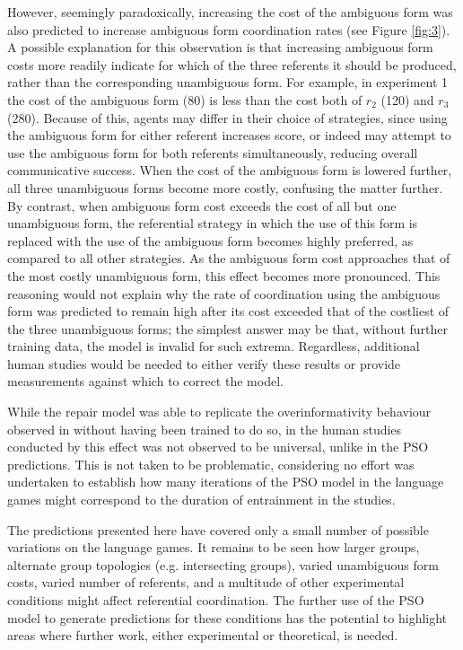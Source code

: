 \documentclass[12pt,a4paper]{article}
\begin{document}
However, seemingly paradoxically, increasing the cost of the ambiguous form was also predicted to increase ambiguous form coordination rates (see Figure \ref{fig:3}). A possible explanation for this observation is that increasing ambiguous form costs more readily indicate for which of the three referents it should be produced, rather than the corresponding unambiguous form. For example, in experiment 1 the cost of the ambiguous form (80) is less than the cost both of $r_2$ (120) and $r_3$ (280). Because of this, agents may differ in their choice of strategies, since using the ambiguous form for either referent increases score, or indeed may attempt to use the ambiguous form for both referents simultaneously, reducing overall communicative success. When the cost of the ambiguous form is lowered further, all three unambiguous forms become more costly, confusing the matter further. By contrast, when ambiguous form cost exceeds the cost of all but one unambiguous form, the referential strategy in which the use of this form is replaced with the use of the ambiguous form becomes highly preferred, as compared to all other strategies. As the ambiguous form cost approaches that of the most costly unambiguous form, this effect becomes more pronounced. This reasoning would not explain why the rate of coordination using the ambiguous form was predicted to remain high after its cost exceeded that of the costliest of the three unambiguous forms; the simplest answer may be that, without further training data, the model is invalid for such extrema. Regardless, additional human studies would be needed to either verify these results or provide measurements against which to correct the model.

While the repair model was able to replicate the overinformativity behaviour observed in \citeauthor{brennan1996} without having been trained to do so, in the human studies conducted by \citeauthor{brennan1996} this effect was not observed to be universal, unlike in the PSO predictions. This is not taken to be problematic, considering no effort was undertaken to establish how many iterations of the PSO model in the \citeauthor{rohde2012} language games might correspond to the duration of entrainment in the \citeauthor{brennan1996} studies.

The predictions presented here have covered only a small number of possible variations on the \citeauthor{rohde2012} language games. It remains to be seen how larger groups, alternate group topologies (e.g. intersecting groups), varied unambiguous form costs, varied number of referents, and a multitude of other experimental conditions might affect referential coordination. The further use of the PSO model to generate predictions for these conditions has the potential to highlight areas where further work, either experimental or theoretical, is needed.
\end{document}
